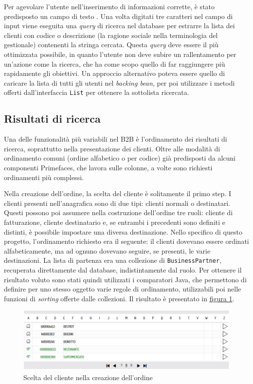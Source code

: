 Per agevolare l'utente nell'inserimento di informazioni corrette, è stato predisposto un campo di testo . Una volta digitati tre caratteri nel campo di input viene eseguita una \textit{query} di ricerca nel database per estrarre la lista dei clienti con codice o descrizione (la ragione sociale nella terminologia del gestionale) contenenti la stringa cercata. Questa \textit{query} deve essere il più ottimizzata possibile, in quanto l'utente non deve subire un rallentamento per un'azione come la ricerca, che ha come scopo quello di far raggiungere più rapidamente gli obiettivi. Un approccio alternativo poteva essere quello di caricare la lista di tutti gli utenti nel \textit{backing bean}, per poi utilizzare i metodi offerti dall'interfaccia \texttt{List} per ottenere la sottolista ricercata.

\subsection{Risultati di ricerca}
Una delle funzionalità più variabili nel B2B è l'ordinamento dei risultati di ricerca, soprattutto nella presentazione dei clienti. Oltre alle modalità di ordinamento comuni (ordine alfabetico o per codice) già predisposti da alcuni componenti Primefaces, che lavora sulle colonne, a volte sono richiesti ordinamenti più complessi.

Nella creazione dell'ordine, la scelta del cliente è solitamente il primo step. I clienti presenti nell'anagrafica sono di due tipi: clienti normali o destinatari. Questi possono poi assumere nella costruzione dell'ordine tre ruoli: cliente di fatturazione, cliente destinatario e, se entrambi i precedenti sono definiti e distinti, è possibile impostare una diversa destinazione. Nello specifico di questo progetto, l'ordinamento richiesto era il seguente: il clienti dovevano essere ordinati alfabeticamente, ma ad ognuno dovevano seguire, se presenti, le varie destinazioni. La lista di partenza era una collezione di \texttt{BusinessPartner}, recuperata direttamente dal database, indistintamente dal ruolo. Per ottenere il risultato voluto sono stati quindi utilizzati i comparatori Java, che permettono di definire per uno stesso oggetto varie regole di ordinamento, utilizzabili poi nelle funzioni di \textit{sorting} offerte dalle collezioni. 
Il risultato è presentato in \hyperref[fig:listaclienti]{figura \ref{fig:listaclienti}}.
\begin{figure}
	\centering
	\includegraphics[width=\linewidth]{Immagini/p1/lista-clienti.png}
	\caption{Scelta del cliente nella creazione dell'ordine}
	\label{fig:listaclienti}
\end{figure}

